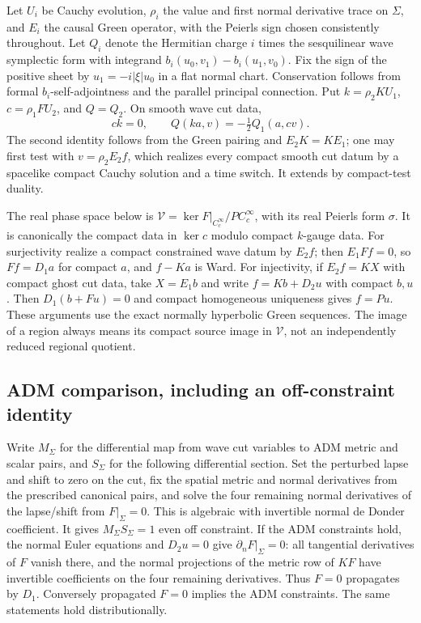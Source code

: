 \documentclass[11pt]{article}
\begin{document}
Let $U_i$ be Cauchy evolution, $\rho_i$ the value and first normal
derivative trace on $\Sigma$, and $E_i$ the causal Green operator,
with the Peierls sign chosen consistently throughout. Let $Q_i$ denote
the Hermitian charge $i$ times the sesquilinear wave symplectic form
with integrand $b_i(u_0,v_1)-b_i(u_1,v_0)$. Fix the sign of the
positive sheet by $u_1=-i|\xi|u_0$ in a flat normal chart. Conservation
follows from formal $b_i$-self-adjointness and the parallel principal
connection. Put $k=\rho_2KU_1$, $c=\rho_1FU_2$, and $Q=Q_2$.
On smooth wave cut data,
\begin{equation}
 ck=0,\qquad Q(ka,v)=-\tfrac12Q_1(a,cv).                 \label{eq:gaugecharge}
\end{equation}
The second identity follows from the Green pairing and $E_2K=KE_1$;
one may first test with $v=\rho_2E_2 f$, which realizes every compact
smooth cut datum by a spacelike compact Cauchy solution and a time
switch. It extends by compact-test duality.

The real phase space below is
$\mathcal V=\ker F|_{C_c^\infty}/P C_c^\infty$, with its real Peierls
form $\sigma$. It is canonically the compact data in $\ker c$ modulo
compact $k$-gauge data. For surjectivity realize a compact constrained
wave datum by $E_2 f$; then $E_1Ff=0$, so $Ff=D_1a$ for compact $a$,
and $f-Ka$ is Ward. For injectivity, if $E_2 f=KX$ with compact ghost
cut data, take $X=E_1b$ and write $f=Kb+D_2u$ with compact $b,u$.
Then $D_1(b+Fu)=0$ and compact homogeneous uniqueness gives $f=Pu$.
These arguments use the exact normally hyperbolic Green sequences.
The image of a region always means its compact source image in
$\mathcal V$, not an independently reduced regional quotient.

\subsection{ADM comparison, including an off-constraint identity}
Write $M_\Sigma$ for the differential map from wave cut variables
to ADM metric and scalar pairs, and $S_\Sigma$ for the following
differential section. Set the perturbed lapse and shift to zero on
the cut, fix the spatial metric and normal derivatives from the
prescribed canonical pairs, and solve the four remaining normal
derivatives of the lapse/shift from $F|_\Sigma=0$. This is algebraic
with invertible normal de Donder coefficient. It gives
$M_\Sigma S_\Sigma=1$ even off constraint. If the ADM constraints
hold, the normal Euler equations and $D_2u=0$ give
$\partial_nF|_\Sigma=0$: all tangential derivatives of $F$ vanish
there, and the normal projections of the metric row of $KF$ have
invertible coefficients on the four remaining derivatives. Thus
$F=0$ propagates by $D_1$. Conversely propagated $F=0$ implies the
ADM constraints. The same statements hold distributionally.
\end{document}
